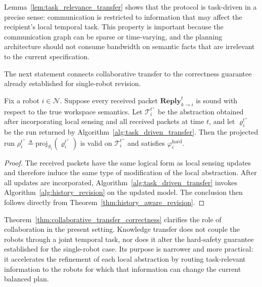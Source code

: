 Lemma~\ref{lem:task_relevance_transfer} shows that the protocol is
task-driven in a precise sense: communication is restricted to information that
may affect the recipient's local temporal task. This property is important
because the communication graph can be sparse or time-varying, and the planning
architecture should not consume bandwidth on semantic facts that are irrelevant
to the current specification.

The next statement connects collaborative transfer to the correctness guarantee
already established for single-robot revision.

\begin{theorem}
\label{thm:collaborative_transfer_correctness}
Fix a robot $i \in \mathcal{N}$. Suppose every received packet
$\mathbf{Reply}_{k \rightarrow i}^{t}$ is sound with respect to the true
workspace semantics. Let $\mathcal{T}_{i}^{t^{+}}$ be the abstraction obtained
after incorporating local sensing and all received packets at time $t$, and let
$\varrho_{i}^{t^{+}}$ be the run returned by
Algorithm~\ref{alg:task_driven_transfer}. Then the projected run
$\rho_{i}^{t^{+}} \triangleq \mathrm{proj}_{S_{i}}(\varrho_{i}^{t^{+}})$ is
valid on $\mathcal{T}_{i}^{t^{+}}$ and satisfies
$\varphi_{i}^{\mathrm{hard}}$.
\end{theorem}

\begin{proof}
The received packets have the same logical form as local sensing updates and
therefore induce the same type of modification of the local abstraction. After
all updates are incorporated, Algorithm~\ref{alg:task_driven_transfer} invokes
Algorithm~\ref{alg:history_revision} on the updated model. The conclusion then
follows directly from Theorem~\ref{thm:history_aware_revision}.
\end{proof}

Theorem~\ref{thm:collaborative_transfer_correctness} clarifies the role of
collaboration in the present setting. Knowledge transfer does not couple the
robots through a joint temporal task, nor does it alter the hard-safety
guarantee established for the single-robot case. Its purpose is narrower and
more practical: it accelerates the refinement of each local abstraction by
routing task-relevant information to the robots for which that information can
change the current balanced plan.


